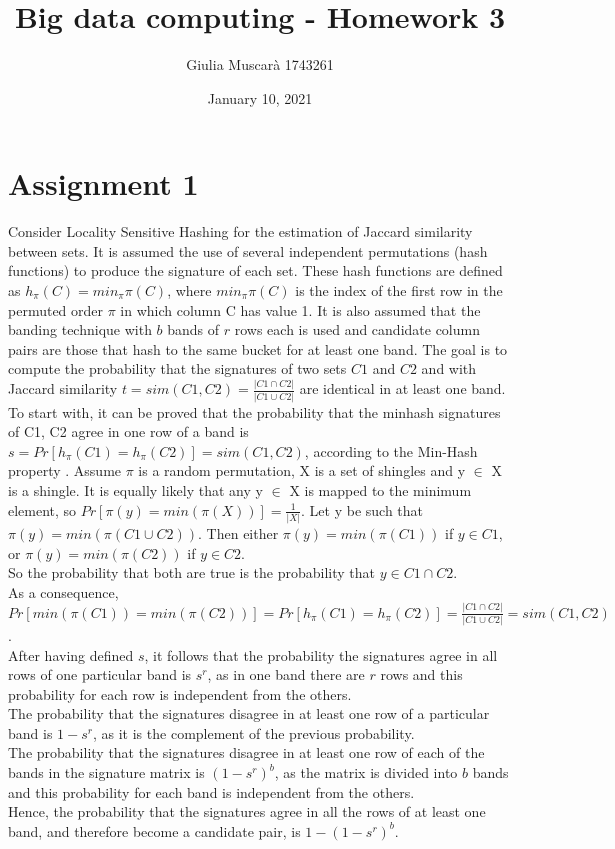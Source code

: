 \documentclass[]{report}
\title{Big data computing - Homework 3}
\author{Giulia Muscarà 1743261}
\date{January 10, 2021}
\begin{document}
\maketitle
\clearpage
\section*{Assignment 1}
Consider Locality Sensitive Hashing for the estimation of Jaccard
similarity between sets. It is assumed the use of several independent permutations (hash functions) to produce the signature of each set. These hash functions are defined as $h_\pi (C) = min_\pi \pi(C)$, where  $min_\pi \pi(C)$ is the index of the first row in the permuted order $\pi$ in which column C has value 1.
It is also assumed that the banding technique with $b$ bands of $r$ rows each is used and candidate column pairs are those that hash to the same bucket for at least one band. The goal is to compute the probability that the signatures of two sets $C1$ and $C2$ and with Jaccard similarity $t = sim(C1,C2) = \frac{|C1 \cap C2|}{|C1 \cup C2|}$ are identical in at least one band.\\
To start with, it can be proved that the probability that the minhash signatures of C1, C2 agree in one row of a band is $s = Pr[h_\pi (C1) = h_\pi (C2)] = sim(C1, C2)$, according to the Min-Hash property \cite{lsh}. Assume $\pi$ is a random permutation,  X is a set of shingles and y $\in$ X is a shingle. It is equally likely that any y $\in$ X is mapped to the minimum element, so $Pr[\pi(y) = min(\pi(X))] = \frac{1}{|X|}$. Let y be such that $\pi(y) = min(\pi(C1 \cup C2))$. Then either $\pi(y) = min(\pi(C1))$ if $y \in C1$, or $\pi(y) = min(\pi(C2))$ if $y \in C2$.\\ So the probability that both are true is the probability that $y \in C1 \cap C2$. \\ As a consequence, $Pr[min(\pi(C1))=min(\pi(C2))]= Pr[h_\pi (C1) = h_\pi (C2)] = \frac{|C1 \cap C2|}{|C1 \cup C2|}= sim(C1, C2)$.
\\
After having defined $s$, it follows that the probability the signatures agree in all rows of one particular band is $s^r$, as in one band there are $r$ rows and this probability for each row is independent from the others. \\
The probability that the signatures disagree in at least one row of a particular band is $1 - s^{r}$, as it is the complement of the previous probability.\\
The probability that the signatures disagree in at least one row of each of the bands in the signature matrix is  $(1 - s^{r})^{b}$, as the matrix is divided into $b$ bands and this probability for each band is independent from the others.\\ Hence, the probability that the signatures agree in all the rows of at least one band, and therefore become a candidate pair, is $1 - (1 - s^r)^b$.
\end{document}
